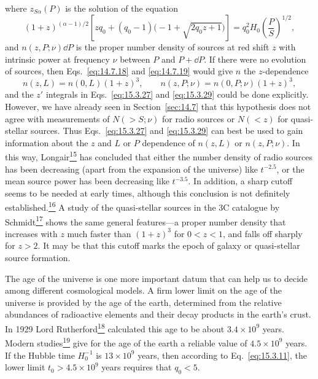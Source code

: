 where \(z_{S\alpha}(P)\) is the solution of the equation
\begin{equation}
  (1+z)^{(\alpha-1)/2}
  \left[
    zq_0+(q_0-1)\bigl(-1+\sqrt{2q_0z+1}\bigr)
  \right]
  =
  q_0^2H_0\left(\frac{P}{S}\right)^{1/2},
  \tag{15.3.30}\label{eq:15.3.30}
\end{equation}
and \(n(z,P;\nu)\dd P\) is the proper number density of sources at red shift
\(z\) with intrinsic power at frequency \(\nu\) between \(P\) and
\(P+\dd P\). If there were no evolution of sources, then
Eqs.~\eqref{eq:14.7.18} and \eqref{eq:14.7.19} would give \(n\) the
\(z\)-dependence
\[
  n(z,L)=n(0,L)(1+z)^3,
  \qquad
  n(z,P;\nu)=n(0,P;\nu)(1+z)^3,
\]
and the \(z'\) integrals in Eqs.~\eqref{eq:15.3.27} and
\eqref{eq:15.3.29} could be done explicitly. However, we have already seen
in Section~\ref{sec:14.7} that this hypothesis does not agree with
measurements of \(N(>S;\nu)\) for radio sources or \(N(<z)\) for
quasi-stellar sources. Thus Eqs.~\eqref{eq:15.3.27} and
\eqref{eq:15.3.29} can best be used to gain information about the \(z\)
and \(L\) or \(P\) dependence of \(n(z,L)\) or \(n(z,P;\nu)\). In this
way, Longair\hyperref[ch15-ref-15]{\textsuperscript{15}} has concluded that
either the number density of radio sources has been decreasing (apart from the
expansion of the universe) like \(t^{-2.5}\), or the mean source power has
been decreasing like \(t^{-3.5}\). In addition, a sharp cutoff seems to be
needed at early times, although this conclusion is not definitely
established.\hyperref[ch15-ref-16]{\textsuperscript{16}} A study of the
quasi-stellar sources in the 3C catalogue by
Schmidt\hyperref[ch15-ref-17]{\textsuperscript{17}} shows the same general
features---a proper number density that increases with \(z\) much faster than
\((1+z)^3\) for \(0<z<1\), and falls off sharply for \(z>2\). It may be
that this cutoff marks the epoch of galaxy or quasi-stellar source formation.

The age of the universe is one more important datum that can help us to decide
among different cosmological models. A firm lower limit on the age of the
universe is provided by the age of the earth, determined from the relative
abundances of radioactive elements and their decay products in the earth's
crust. In 1929 Lord
Rutherford\hyperref[ch15-ref-18]{\textsuperscript{18}} calculated this age
to be about \(3.4\times10^9\) years. Modern
studies\hyperref[ch15-ref-19]{\textsuperscript{19}} give for the age of the
earth a reliable value of \(4.5\times10^9\) years. If the Hubble time
\(H_0^{-1}\) is \(13\times10^9\) years, then according to
Eq.~\eqref{eq:15.3.11}, the lower limit \(t_0>4.5\times10^9\) years
requires that \(q_0<5\).

